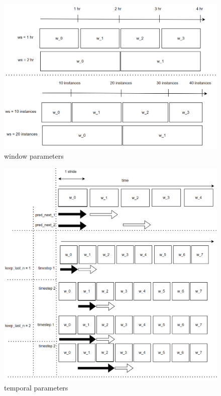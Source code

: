 \documentclass{IEEEtran}
\begin{document}
\begin{figure}[htbp]
\centering
\includegraphics[width=.9\linewidth]{./images/screenshot_20220321_110302.png}
\caption{\label{window_parameters}window parameters}
\end{figure}

\begin{figure}[htbp]
\centering
\includegraphics[width=.9\linewidth]{./images/screenshot_20220321_130701.png}
\caption{\label{temporal_parameters}temporal parameters}
\end{figure}
\end{document}
